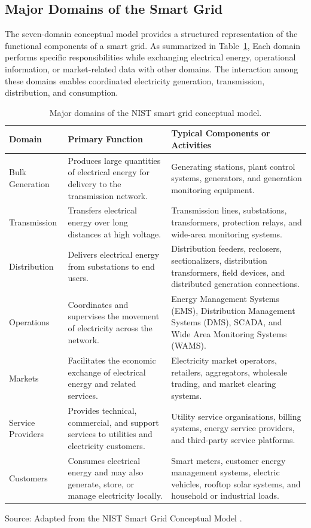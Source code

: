 \documentclass[12pt,a4paper]{report}
\begin{document}
\subsection{Major Domains of the Smart Grid}
The seven-domain conceptual model provides a structured representation of the functional
components of a smart grid. As summarized in Table~\ref{tab:smartgrid_domains}, Each domain performs specific responsibilities while exchanging
electrical energy, operational information, or market-related data with other domains. The
interaction among these domains enables coordinated electricity generation, transmission,
distribution, and consumption.

\begin{table}[htbp]
\centering
\caption{Major domains of the NIST smart grid conceptual model.}
\label{tab:smartgrid_domains}
\renewcommand{\arraystretch}{1.3}
\small
\begin{tabular}{|p{3.0cm}|p{5.0cm}|p{6.0cm}|}
\hline
\textbf{Domain} & \textbf{Primary Function} & \textbf{Typical Components or Activities} \\
\hline
Bulk Generation & Produces large quantities of electrical energy for delivery to the transmission network. & Generating stations, plant control systems, generators, and generation monitoring equipment. \\
\hline
Transmission & Transfers electrical energy over long distances at high voltage. & Transmission lines, substations, transformers, protection relays, and wide-area monitoring systems. \\
\hline
Distribution & Delivers electrical energy from substations to end users. & Distribution feeders, reclosers, sectionalizers, distribution transformers, field devices, and distributed generation connections. \\
\hline
Operations & Coordinates and supervises the movement of electricity across the network. & Energy Management Systems (EMS), Distribution Management Systems (DMS), SCADA, and Wide Area Monitoring Systems (WAMS). \\
\hline
Markets & Facilitates the economic exchange of electrical energy and related services. & Electricity market operators, retailers, aggregators, wholesale trading, and market clearing systems. \\
\hline
Service Providers & Provides technical, commercial, and support services to utilities and electricity customers. & Utility service organisations, billing systems, energy service providers, and third-party service platforms. \\
\hline
Customers & Consumes electrical energy and may also generate, store, or manage electricity locally. & Smart meters, customer energy management systems, electric vehicles, rooftop solar systems, and household or industrial loads. \\
\hline
\end{tabular}
\begin{flushleft}
\footnotesize Source: Adapted from the NIST Smart Grid Conceptual Model \cite{nist2014framework}.
\end{flushleft}
\end{table}
\end{document}
